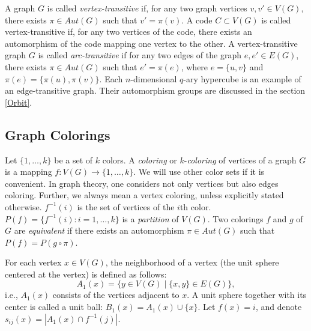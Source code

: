 \documentclass[11pt]{article}
\theoremstyle{definition}
\begin{document}
A graph $G$ is called {\sl vertex-transitive} if, for any two
graph vertices $v,v'\in V(G)$, there exists $\pi\in Aut(G)$ such that
$v'=\pi(v)$. A code $C\subset V(G)$ is called vertex-transitive
if, for any two vertices of the code, there exists an automorphism of the code
mapping one vertex to the other.
A vertex-transitive graph $G$ is called {\sl arc-transitive}  if for any two
edges of the graph $e,e'\in E(G)$, there exists $\pi\in Aut(G)$ such that
$e'=\pi(e)$, where $e=\{u,v\}$ and $\pi(e)=\{\pi(u),\pi(v)\}$.
Each $n$-dimensional $q$-ary hypercube is an 
example of an edge-transitive graph. Their automorphism groups 
are discussed in the section \ref{Orbit}.






\subsection{Graph Colorings}

Let $\{1,\ldots,k\}$ be a set of $k$ colors.  A {\sl coloring} or  $k$-{\sl coloring}  of vertices of a graph $G$ is a mapping $f: V(G) \rightarrow
\{1,\ldots,k\}$. We will use other color sets if it is convenient. 
In graph theory, one considers  not only vertices but also edges coloring. Further,   we always mean a vertex coloring, unless explicitly stated otherwise. $f^{-1}(i)$ is the set of vertices of the $i$th color. $P(f)=\{f^{-1}(i) : i=1,\dots,k\}$ is a {\sl partition} of $V(G)$.  Two colorings $f$ and $g$ of $G$ are {\sl equivalent} if there exists an automorphism $\pi\in Aut(G)$ such that $P(f)=P(g\circ \pi)$.

For each vertex $x\in V(G)$, the neighborhood of a vertex (the unit sphere centered at the vertex) is defined as follows: $$A_1(x)=\{y\in
V(G) \mid \{x,y\}\in E(G)\},$$ i.e.,  $A_1(x)$ consists of the vertices
adjacent to  $x$. A unit sphere together with its center is called  a unit ball: $B_1(x)=A_1(x)\cup \{x\}$.
Let $f(x)=i$, and denote $s_{ij}(x)=|A_1(x)\cap f^{-1}(j)|$.
\end{document}
